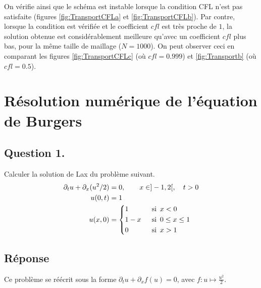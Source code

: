 \documentclass[
	french,
	11pt, %
]{fphw}
\newcommand{\hquad}{\hspace{0.5em}} %
\begin{document}
\noindent On vérifie ainsi que le schéma est instable lorsque la condition CFL n'est pas satisfaite (figures \ref{fig:TransportCFLa} et \ref{fig:TransportCFLb}). Par contre, lorsque la condition est vérifiée et le coefficient $cfl$ est très proche de $1$, la solution obtenue est considérablement meilleure qu'avec un coefficient $cfl$ plus bas, pour la même taille de maillage ($N = 1000$). On peut observer ceci en comparant les figures \ref{fig:TransportCFLc} (où $cfl=0.999$) et \ref{fig:Transportb} (où $cfl=0.5$).




\vspace*{2cm}

\section{Résolution numérique de l'équation de Burgers}

\subsection*{Question 1.}
\begin{problem}
	Calculer la solution de Lax du problème suivant.
	\begin{align*}
			\partial_t u + \partial_x (u^2/2) &= 0, \qquad x \in ]-1, 2[, \quad t >0 \\
			u(0, t) &= 1 \\
			u(x, 0) &= 
			\begin{dcases}
				1 \hquad & \text{si} \hquad x<0 \\	
				1-x \hquad & \text{si} \hquad 0 \leq x \leq 1 \\	
				0 \hquad & \text{si} \hquad x>1
			\end{dcases}
	\end{align*}
\end{problem}


\subsection*{Réponse}

Ce problème se réécrit sous la forme $\partial_t u + \partial_x f(u) = 0$, avec $f: u \mapsto \frac{u^2}{2}$.
\end{document}
